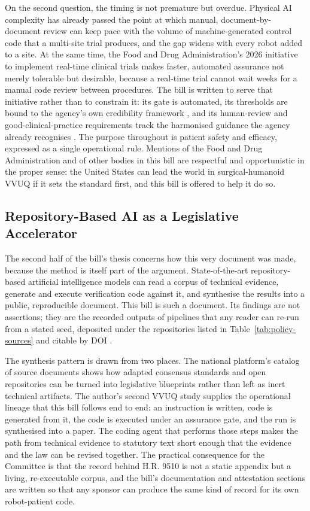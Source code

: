 On the second question, the timing is not premature but overdue. Physical AI
complexity has already passed the point at which manual, document-by-document
review can keep pace with the volume of machine-generated control code that a
multi-site trial produces, and the gap widens with every robot added to a site.
At the same time, the Food and Drug Administration's 2026 initiative to implement
real-time clinical trials \cite{fda2026realtime} makes faster, automated
assurance not merely tolerable but desirable, because a real-time trial cannot
wait weeks for a manual code review between procedures. The bill is written to
serve that initiative rather than to constrain it: its gate is automated, its
thresholds are bound to the agency's own credibility framework
\cite{fda2023credibility}, and its human-review and good-clinical-practice
requirements track the harmonised guidance the agency already recognises
\cite{iche6r3}. The purpose throughout is patient safety and efficacy, expressed
as a single operational rule. Mentions of the Food and Drug Administration and of
other bodies in this bill are respectful and opportunistic in the proper sense:
the United States can lead the world in surgical-humanoid VVUQ if it sets the
standard first, and this bill is offered to help it do so.

\subsection{Repository-Based AI as a Legislative Accelerator}

The second half of the bill's thesis concerns how this very document was made,
because the method is itself part of the argument. State-of-the-art
repository-based artificial intelligence models can read a corpus of technical
evidence, generate and execute verification code against it, and synthesise the
results into a public, reproducible document. This bill is such a document. Its
findings are not assertions; they are the recorded outputs of pipelines that any
reader can re-run from a stated seed, deposited under the repositories listed in
Table~\ref{tab:policy-sources} and citable by DOI \cite{repo-cancer-automated,
repo-physical-ai}.

The synthesis pattern is drawn from two places. The national platform's catalog
of source documents shows how adapted consensus standards and open repositories
can be turned into legislative blueprints rather than left as inert technical
artifacts. The author's second VVUQ study supplies the operational lineage that
this bill follows end to end: an instruction is written, code is generated from
it, the code is executed under an assurance gate, and the run is synthesised into
a paper. The coding agent that performs those steps \cite{anthropicclaudecode}
makes the path from technical evidence to statutory text short enough that the
evidence and the law can be revised together. The practical consequence for the
Committee is that the record behind H.R. 9510 is not a static appendix but a
living, re-executable corpus, and the bill's documentation and attestation
sections are written so that any sponsor can produce the same kind of record for
its own robot-patient code.

